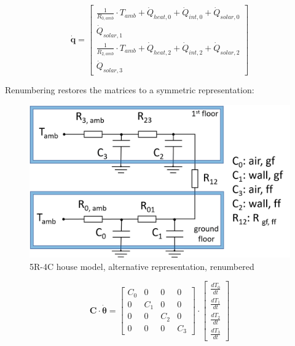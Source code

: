 \begin{equation}
	\mathbf{\dot{q}} =
	\begin{bmatrix}
		\frac{1}{R_{0, amb}} \cdot T_{amb} + \dot{Q}_{heat, 0} + \dot{Q}_{int, 0} + \dot{Q}_{solar, 0} \\
		\dot{Q}_{solar, 1} \\
		\frac{1}{R_{2, amb}} \cdot T_{amb} + \dot{Q}_{heat, 2} + \dot{Q}_{int, 2} + \dot{Q}_{solar, 2} \\
		\dot{Q}_{solar, 3} 
	\end{bmatrix}
\end{equation}

Renumbering restores the matrices to a symmetric representation:

\begin{figure}[H]
	\centering
	\includegraphics[width=0.6\columnwidth]{Figures/5R4C_renumbered.png}
	\caption[Short title]{5R-4C house model, alternative representation, renumbered}
	\label{fig:renum5R4C}
\end{figure}

\begin{equation}
	\mathbf{C} \cdot \boldsymbol{\dot{\theta}} =
	\begin{bmatrix}
		C_{0} & 0 & 0 & 0\\
		0 &  C_{1} & 0 & 0 \\
		0 & 0 & C_{2} & 0\\
		0 & 0 & 0 & C_{3}
	\end{bmatrix}
	\cdot
	\begin{bmatrix}
		\frac{dT_{0}}{dt} \\
		\frac{dT_{1}}{dt} \\
		\frac{dT_{2}}{dt} \\
		\frac{dT_{3}}{dt} 
	\end{bmatrix}
\end{equation}

